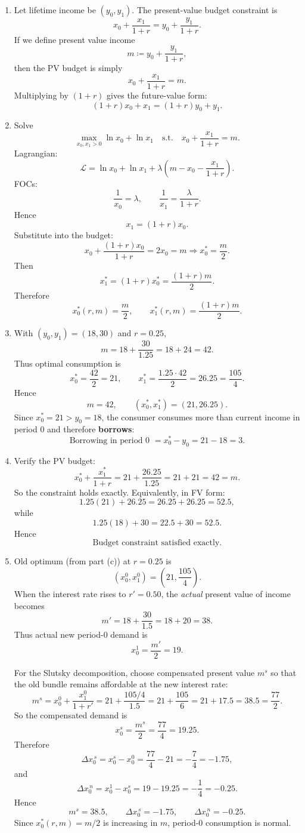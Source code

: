 \documentclass[12pt]{article}
\begin{document}
\begin{enumerate}[label=(\alph*)]
\item Let lifetime income be $(y_0,y_1)$. The present-value budget constraint is
\[
x_0+\frac{x_1}{1+r}=y_0+\frac{y_1}{1+r}.
\]
If we define present value income
\[
m\coloneqq y_0+\frac{y_1}{1+r},
\]
then the PV budget is simply
\[
\boxed{x_0+\frac{x_1}{1+r}=m.}
\]
Multiplying by $(1+r)$ gives the future-value form:
\[
\boxed{(1+r)x_0+x_1=(1+r)y_0+y_1.}
\]

\item Solve
\[
\max_{x_0,x_1>0} \ln x_0+\ln x_1
\quad\text{s.t.}\quad x_0+\frac{x_1}{1+r}=m.
\]
Lagrangian:
\[
\mathcal L = \ln x_0+\ln x_1+\lambda\left(m-x_0-\frac{x_1}{1+r}\right).
\]
FOCs:
\[
\frac{1}{x_0}=\lambda,
\qquad
\frac{1}{x_1}=\frac{\lambda}{1+r}.
\]
Hence
\[
x_1=(1+r)x_0.
\]
Substitute into the budget:
\[
x_0+\frac{(1+r)x_0}{1+r}=2x_0=m
\Rightarrow x_0^*=\frac{m}{2}.
\]
Then
\[
x_1^*=(1+r)x_0^*=\frac{(1+r)m}{2}.
\]
Therefore
\[
\boxed{x_0^*(r,m)=\frac{m}{2},\qquad x_1^*(r,m)=\frac{(1+r)m}{2}.}
\]

\item With $(y_0,y_1)=(18,30)$ and $r=0.25$,
\[
m=18+\frac{30}{1.25}=18+24=42.
\]
Thus optimal consumption is
\[
x_0^*=\frac{42}{2}=21,
\qquad
x_1^*=\frac{1.25\cdot 42}{2}=26.25=\frac{105}{4}.
\]
Hence
\[
\boxed{m=42,\qquad (x_0^*,x_1^*)=(21,26.25).}
\]
Since $x_0^*=21>y_0=18$, the consumer consumes more than current income in period 0 and therefore \textbf{borrows}:
\[
\boxed{\text{Borrowing in period 0 }=x_0^*-y_0=21-18=3.}
\]

\item Verify the PV budget:
\[
x_0^*+\frac{x_1^*}{1+r}=21+\frac{26.25}{1.25}=21+21=42=m.
\]
So the constraint holds exactly.
Equivalently, in FV form:
\[
1.25(21)+26.25 = 26.25+26.25 = 52.5,
\]
while
\[
1.25(18)+30 = 22.5+30 = 52.5.
\]
Hence
\[
\boxed{\text{Budget constraint satisfied exactly.}}
\]

\item Old optimum (from part (c)) at $r=0.25$ is
\[
(x_0^0,x_1^0)=\left(21,\frac{105}{4}\right).
\]
When the interest rate rises to $r'=0.50$, the \emph{actual} present value of income becomes
\[
m' = 18+\frac{30}{1.5}=18+20=38.
\]
Thus actual new period-0 demand is
\[
x_0^1 = \frac{m'}{2}=19.
\]

For the Slutsky decomposition, choose compensated present value $m^s$ so that the old bundle remains affordable at the new interest rate:
\[
m^s = x_0^0 + \frac{x_1^0}{1+r'} = 21 + \frac{105/4}{1.5}
=21+\frac{105}{6}=21+17.5=38.5=\frac{77}{2}.
\]
So the compensated demand is
\[
x_0^s = \frac{m^s}{2} = \frac{77}{4}=19.25.
\]
Therefore
\[
\Delta x_0^{\,s}=x_0^s-x_0^0 = \frac{77}{4}-21 = -\frac{7}{4}=-1.75,
\]
and
\[
\Delta x_0^{\,n}=x_0^1-x_0^s = 19-19.25 = -\frac14=-0.25.
\]
Hence
\[
\boxed{m^s=38.5,\qquad \Delta x_0^{\,s}=-1.75,\qquad \Delta x_0^{\,n}=-0.25.}
\]
Since $x_0^*(r,m)=m/2$ is increasing in $m$, period-0 consumption is normal.
\end{enumerate}
\end{document}
